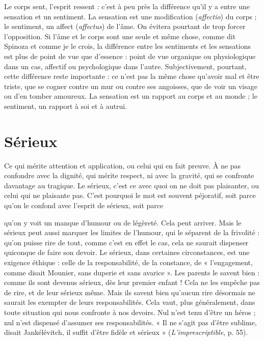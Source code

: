 Le corps sent, l'esprit ressent : c’est à peu près la différence qu'il y a entre
une sensation et un sentiment. La sensation est une modification ({\it affectio}) du
corps ; le sentiment, un affect ({\it affectus}) de l'âme. On évitera pourtant de trop
forcer l’opposition. Si l’âme et le corps sont une seule et même chose, comme
dit Spinoza et comme je le crois, la différence entre les sentiments et les sensations
est plus de point de vue que d’essence : point de vue organique ou physiologique
dans un cas, affectif ou psychologique dans l’autre. Subjectivement,
pourtant, cette différence reste importante : ce n’est pas la même chose qu'avoir
mal et être triste, que se cogner contre un mur ou contre ses angoisses, que de
voir un visage ou d’en tomber amoureux. La sensation est un rapport au corps
et au monde ; le sentiment, un rapport à soi et à autrui.

\section{Sérieux}
Ce qui mérite attention et application, ou celui qui en fait preuve.
À ne pas confondre avec la dignité, qui mérite respect, ni avec la
gravité, qui se confronte davantage au tragique. Le sérieux, c'est ce avec quoi on
ne doit pas plaisanter, ou celui qui ne plaisante pas. C’est pourquoi le mot est
souvent péjoratif, soit parce qu’on le confond avec l’esprit de sérieux, soit parce

qu'on y voit un manque d’humour ou de légèreté. Cela peut arriver. Mais le
sérieux peut aussi marquer les limites de l'humour, qui le séparent de la
frivolité : qu’on puisse rire de tout, comme c’est en effet le cas, cela ne saurait
dispenser quiconque de faire son devoir. Le sérieux, dans certaines circonstances,
est une exigence éthique : celle de la responsabilité, de la constance, de
« l'engagement, comme disait Mounier, sans duperie et sans avarice ». Les
parents le savent bien : comme ils sont devenus sérieux, dès leur premier
enfant ! Cela ne les empêche pas de rire, et de leur sérieux même. Mais ils
savent bien qu’aucun rire désormais ne saurait les exempter de leurs responsabilités.
Cela vaut, plus généralement, dans toute situation qui nous confronte à
nos devoirs. Nul n’est tenu d’être un héros ; nul n’est dispensé d’assumer ses
responsabilités. « Il ne s’agit pas d’être sublime, disait Jankélévitch, il suffit
d’être fidèle et sérieux » ({\it L'imprescriptible}, p. 55).

